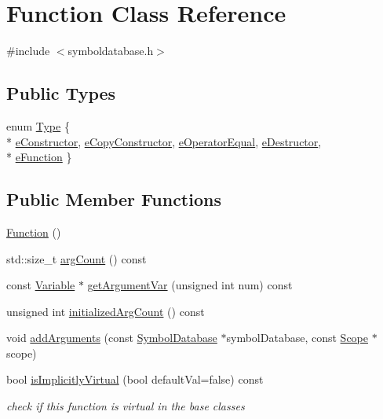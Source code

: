 \hypertarget{class_function}{\section{Function Class Reference}
\label{class_function}
}


{\ttfamily \#include $<$symboldatabase.\-h$>$}

\subsection*{Public Types}
\begin{DoxyCompactItemize}
\item 
enum \hyperlink{class_function_ae5299683e0645400588dfad5df29c52e}{Type} \{ \\*
\hyperlink{class_function_ae5299683e0645400588dfad5df29c52ea03a17f56eb7a37a8af8835a981753352}{e\-Constructor}, 
\hyperlink{class_function_ae5299683e0645400588dfad5df29c52ea39a4af998cecc830568bc4535e6bcae9}{e\-Copy\-Constructor}, 
\hyperlink{class_function_ae5299683e0645400588dfad5df29c52eab53252bcb9343577446be70327b76cd8}{e\-Operator\-Equal}, 
\hyperlink{class_function_ae5299683e0645400588dfad5df29c52eaa9d43d8d7ec25260d79c08044ab19ded}{e\-Destructor}, 
\\*
\hyperlink{class_function_ae5299683e0645400588dfad5df29c52eae3e7637565bc826c945365cd31d1c540}{e\-Function}
 \}
\end{DoxyCompactItemize}
\subsection*{Public Member Functions}
\begin{DoxyCompactItemize}
\item 
\hyperlink{class_function_ae206568fd4fd4c885e3ccff76345c4e6}{Function} ()
\item 
std\-::size\-\_\-t \hyperlink{class_function_a9715633b90233b36c8d46f82f3cc5cd8}{arg\-Count} () const 
\item 
const \hyperlink{class_variable}{Variable} $\ast$ \hyperlink{class_function_a770b2ec56a21d57636970ccd4d65a836}{get\-Argument\-Var} (unsigned int num) const 
\item 
unsigned int \hyperlink{class_function_a14594f5b4495fef07b2a9e95b9b8b44f}{initialized\-Arg\-Count} () const 
\item 
void \hyperlink{class_function_a2685150739e3dccd1d0684cd8f727b4b}{add\-Arguments} (const \hyperlink{class_symbol_database}{Symbol\-Database} $\ast$symbol\-Database, const \hyperlink{class_scope}{Scope} $\ast$scope)
\item 
bool \hyperlink{class_function_ac4aa20ff6426e5d197c6abbf059efb6d}{is\-Implicitly\-Virtual} (bool default\-Val=false) const 
\begin{DoxyCompactList}\small\item\em check if this function is virtual in the base classes \end{DoxyCompactList}\end{DoxyCompactItemize}
